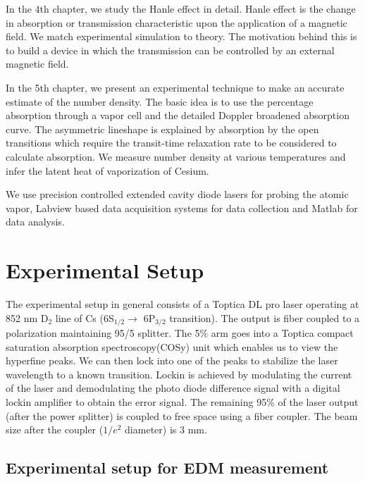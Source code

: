 In the 4th chapter, we study the Hanle effect in detail. Hanle effect is the change in absorption or transmission characteristic upon the application of a magnetic field.  We match experimental simulation to theory. The motivation behind this is to build a device in which the transmission can be controlled by an external magnetic field.

In the 5th chapter, we present an experimental technique to make an accurate estimate of the number density. The basic idea is to use the percentage absorption through a vapor cell and the detailed Doppler broadened absorption curve. The asymmetric lineshape is explained by absorption by the open transitions which require the transit-time relaxation rate to be considered to calculate absorption. We measure number density at various temperatures and infer the latent heat of vaporization of Cesium.

We use precision controlled extended cavity diode lasers for probing the atomic vapor, Labview based data acquisition systems for data collection and Matlab for data analysis.


\chapter{Experimental Setup}

The experimental setup in general consists of a Toptica DL pro laser operating at 852 nm D$_2$ line of Cs (6S$_{1/2} \rightarrow $ 6P$_{3/2}$ transition). The output is fiber coupled to a polarization maintaining 95/5 splitter. The 5\% arm goes into a Toptica compact saturation absorption spectroscopy(COSy) unit which enables us to view the hyperfine peaks. We can then lock into one of the peaks to stabilize the laser wavelength to a known transition. Lockin is achieved by modulating the current of the laser and demodulating the photo diode difference signal with a digital lockin amplifier to obtain the error signal. The remaining 95\% of the laser output (after the power splitter) is coupled to free space using a fiber coupler. The beam size after the coupler ($1/e^2$ diameter) is 3 mm.

\section{Experimental setup for EDM measurement}

